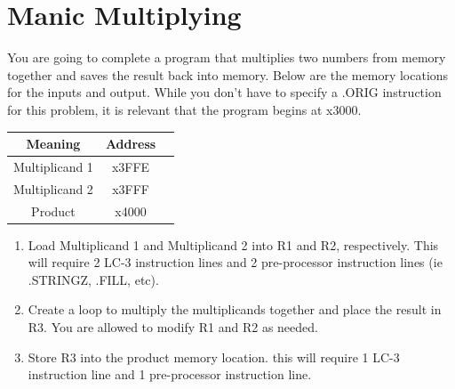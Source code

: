 \documentclass{article}
\begin{document}
    \section{Manic Multiplying}
    You are going to complete a program that multiplies two numbers from memory together and saves the result back into memory. Below are the memory locations for the inputs and output. While you don't have to specify a .ORIG instruction for this problem, it is relevant that the program begins at x3000.
    \begin{table}[h]
        \centering
        \begin{tabular}{|c|c|c|}
        \hline
        \textbf{Meaning} & \textbf{Address} \\\hline
        Multiplicand 1 & x3FFE \\\hline
        Multiplicand 2 & x3FFF \\\hline
        Product & x4000 \\
        \hline
        \end{tabular}
        \end{table}
    \begin{enumerate}[label=(\alph*), itemsep = 140pt]
        \item Load Multiplicand 1 and Multiplicand 2 into R1 and R2, respectively. This will require 2 LC-3 instruction lines and 2 pre-processor instruction lines (ie .STRINGZ, .FILL, etc).
        \item Create a loop to multiply the multiplicands together and place the result in R3. You are allowed to modify R1 and R2 as needed.
        \item Store R3 into the product memory location. this will require 1 LC-3 instruction line and 1 pre-processor instruction line.

    \end{enumerate}
    \newpage
    
\end{document}
